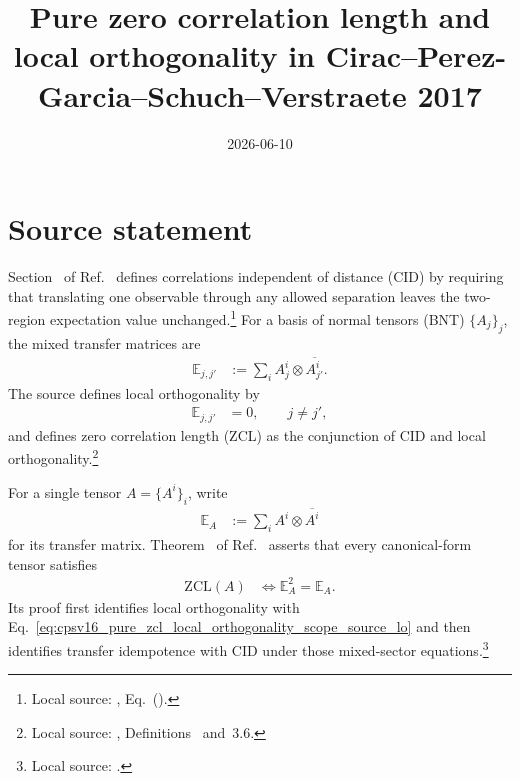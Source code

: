 \documentclass{article}
\title{Pure zero correlation length and local orthogonality in
Cirac--Perez-Garcia--Schuch--Verstraete 2017}
\author{}
\date{2026-06-10}
\begin{document}
\maketitle
{}

\section{Source statement}

Section~ of Ref.~\cite{Cirac2016MPDO_arXiv} defines
correlations independent of distance (CID) by requiring that translating one
observable through any allowed separation leaves the two-region expectation
value unchanged.\footnote{Local source:
, Eq.~().}
For a basis of normal tensors (BNT) $\{A_j\}_j$, the mixed transfer matrices
are
\begin{align}
    \mathbb E_{j,j'}
        &:= \sum_i A_j^i\otimes\overline{A_{j'}^i}.
    \label{eq:cpsv16_pure_zcl_local_orthogonality_scope_mixed_transfer}
\end{align}
The source defines local orthogonality by
\begin{align}
    \mathbb E_{j,j'} &= 0,
    \qquad j\ne j',
    \tag{LO}
    \label{eq:cpsv16_pure_zcl_local_orthogonality_scope_source_lo}
\end{align}
and defines zero correlation length (ZCL) as the conjunction of CID and local
orthogonality.\footnote{Local source:
,
Definitions~ and~3.6.}

For a single tensor $A=\{A^i\}_i$, write
\begin{align}
    \mathbb E_A
        &:= \sum_i A^i\otimes\overline{A^i}
    \label{eq:cpsv16_pure_zcl_local_orthogonality_scope_transfer_matrix}
\end{align}
for its transfer matrix. Theorem~ of
Ref.~\cite{Cirac2016MPDO_arXiv} asserts that every canonical-form tensor
satisfies
\begin{align}
    \mathrm{ZCL}(A)
        &\Longleftrightarrow \mathbb E_A^2=\mathbb E_A.
    \label{eq:cpsv16_pure_zcl_local_orthogonality_scope_source_equivalence}
\end{align}
Its proof first identifies local orthogonality with
Eq.~\ref{eq:cpsv16_pure_zcl_local_orthogonality_scope_source_lo} and then
identifies transfer idempotence with CID under those mixed-sector
equations.\footnote{Local source:
.}
\end{document}
